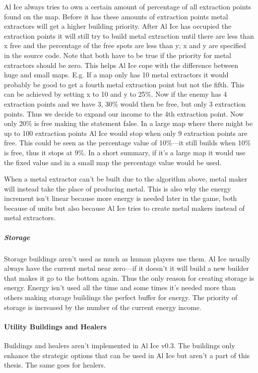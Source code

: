 Al Ice always tries to own a certain amount of percentage of all extraction points found on the map.
Before it has these amounts of extraction points metal extractors will get a higher building
priority. After Al Ice has occupied the extraction points it will still try to build metal
extraction until there are less than x free and the percentage of the free spots are less than y; x
and y are specified in the source code. Note that both have to be true if the priority for metal
extractors should be zero. This helps Al Ice cope with the difference between huge and small
maps. E.g. If a map only has 10 metal extractors it would probably be good to get a fourth metal extraction
point but not the fifth. This can be achieved by setting x to 10 and y to 25\%. Now if the enemy has
4 extraction points and we have 3, 30\% would then be free, but only 3 extraction points. Thus we
decide to expand our income to the 4th extraction point. Now only 20\% is free making the
statement false. In a large map where there might be up to 100 extraction points Al Ice would stop when only 9
extraction points are free. This could be seen as the percentage value of 10\%---it still builds
when 10\% is free, thus it stops at 9\%. In a short summary, if it's a large map it would use the
fixed value and in a small map the percentage value would be used.

When a metal extractor can't be built due to the algorithm above, metal maker will instead take the
place of producing metal. This is also why the energy increment isn't linear because more energy
is needed later in the game, both because of units but also because Al Ice tries to create metal
makers instead of metal extractors.

\subparagraph{Storage}
Storage buildings aren't used as much as human players use them. Al Ice usually always have the
current metal near zero---if it doesn't it will build a new builder that makes it go to the bottom
again. Thus the only reason for creating storage is energy. Energy isn't used all the time and some
times it's needed more than others making storage buildings the perfect buffer for energy. The
priority of storage is increased by the number of the current energy income.

\paragraph{Utility Buildings and Healers}
Buildings and healers aren't implemented in Al Ice v0.3. The buildings only enhance the strategic
options that can be used in Al Ice but aren't a part of this thesis. The same goes for healers.


